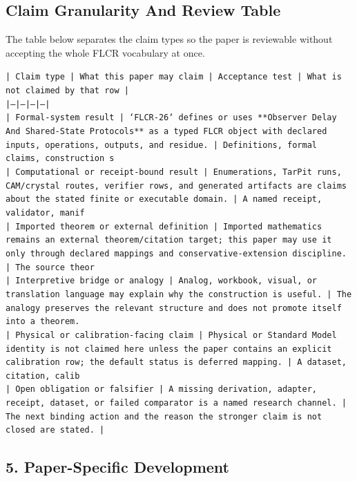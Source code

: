 \documentclass[11pt]{article}
\begin{document}
\subsection*{Claim Granularity And Review Table}

The table below separates the claim types so the paper is reviewable without accepting the whole FLCR vocabulary at once.

\noindent\texttt{| Claim type | What this paper may claim | Acceptance test | What is not claimed by that row |}\\
\noindent\texttt{|---|---|---|---|}\\
\noindent\texttt{| Formal-system result | `FLCR-26` defines or uses **Observer Delay And Shared-State Protocols** as a typed FLCR object with declared inputs, operations, outputs, and residue. | Definitions, formal claims, construction s}\\
\noindent\texttt{| Computational or receipt-bound result | Enumerations, TarPit runs, CAM/crystal routes, verifier rows, and generated artifacts are claims about the stated finite or executable domain. | A named receipt, validator, manif}\\
\noindent\texttt{| Imported theorem or external definition | Imported mathematics remains an external theorem/citation target; this paper may use it only through declared mappings and conservative-extension discipline. | The source theor}\\
\noindent\texttt{| Interpretive bridge or analogy | Analog, workbook, visual, or translation language may explain why the construction is useful. | The analogy preserves the relevant structure and does not promote itself into a theorem. }\\
\noindent\texttt{| Physical or calibration-facing claim | Physical or Standard Model identity is not claimed here unless the paper contains an explicit calibration row; the default status is deferred mapping. | A dataset, citation, calib}\\
\noindent\texttt{| Open obligation or falsifier | A missing derivation, adapter, receipt, dataset, or failed comparator is a named research channel. | The next binding action and the reason the stronger claim is not closed are stated. | }\\

\subsection*{5. Paper-Specific Development}
\end{document}
